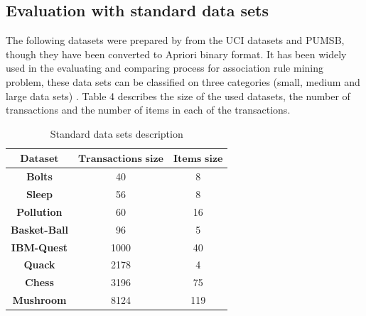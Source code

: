 \documentclass[preprint,12pt]{elsarticle}
\begin{document}
\subsection{Evaluation with standard data sets}
The following datasets were prepared by \cite{28} from the UCI datasets and PUMSB, 
though they have been converted to Apriori binary format. It has been widely used in 
the evaluating and comparing process for association rule mining problem, these data sets can be classified on three categories 
(small, medium and large data sets) \cite{29}. Table 4 describes the size of the used datasets, the number of transactions and the number
of items in each of the transactions. 
\begin{table}[htbp]
\small
\label{datas}
\caption{Standard data sets description}
\begin{center}
\begin{tabular}{c c c}
\toprule
$\textbf{Dataset}$&$\textbf{Transactions size}$&$\textbf{Items size}$\\\hline
\textbf{Bolts}	&40	&8\\\hline
\textbf{Sleep}	&56	&8\\\hline
\textbf{Pollution}	&60	&16\\\hline
\textbf{Basket-Ball}	&96	&5	\\\hline
\textbf{IBM-Quest}	&1000	&40	\\\hline
\textbf{Quack}	&2178	&4	\\\hline
\textbf{Chess}	&3196	&75	\\\hline
\textbf{Mushroom}	&8124	&119 	\\\hline
\bottomrule
\end{tabular}
\end{center}
\end{table}
\end{document}
